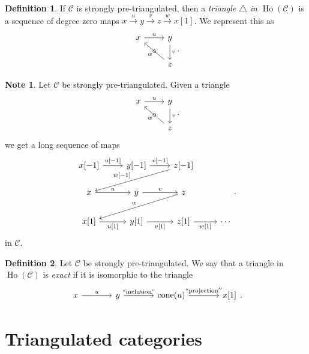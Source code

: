 \documentclass[10pt,letterpaper,cm]{nupset}
\theoremstyle{definition}
\newtheorem*{definition}{Definition}
\newtheorem{note}{Note}
\newcommand{\1}{\mathbf{1}}
\renewcommand{\c}{\mathscr{C}}
\newcommand{\0}{\vec 0}
\DeclareMathOperator{\cone}{cone}
\DeclareMathOperator{\ho}{Ho}
\begin{document}
\begin{definition}
If $\c$ is strongly pre-triangulated, then a \textit{triangle $\triangle$ in $\ho(\c)$} is a sequence of degree zero maps $x\overset{u}{\longrightarrow} y\overset{v}{\longrightarrow}z \overset{w}{\longrightarrow}  x[1]$. We represent this as 
\[
\begin{tikzcd}
x \arrow[r, "u"] & y \arrow[d, "v"]  \\
                 & z \arrow[lu, "\circ" marking, "w"]
\end{tikzcd}
.\]
\end{definition}

\begin{note} Let $\c$ be  strongly pre-triangulated. 
Given a triangle 
\[
\begin{tikzcd}
x \arrow[r, "u"] & y \arrow[d, "v"]  \\
                 & z \arrow[lu, "\circ" marking, "w"]
\end{tikzcd}
.\]
we get a long sequence of maps 
\[
\begin{tikzcd}
{x[{-}1]} \arrow[r, "{u[{-}1]}"] & {y[{-}1]} \arrow[r, "{v[{-}1]}"] & {z[{-}1]} \arrow[lld, "{w[{-}1]}"'] &        \\
x \arrow[r, "u"]                 & y \arrow[r, "v"]                 & z \arrow[lld, "w"']                 &        \\
{x[1]} \arrow[r, "{u[1]}"']      & {y[1]} \arrow[r, "{v[1]}"']      & {z[1]} \arrow[r, "{w[1]}"']         & \cdots
\end{tikzcd}.
\]
in $\c$.
\end{note}

\begin{definition}  Let $\c$ be strongly pre-triangulated.
We say that a triangle in $\ho(\c)$ is \textit{exact} if it is isomorphic to the triangle
\[
\begin{tikzcd}[column sep=large]
x \arrow[r, "u"] & y \arrow[r, "{``\text{inclusion}"}"] & \cone(u) \arrow[r, "``\text{projection}''"] & {x[1]}
\end{tikzcd}
.\]
\end{definition}

\section{Triangulated categories}
\end{document}
